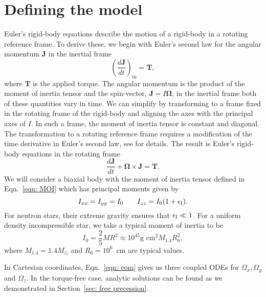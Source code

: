 \documentclass[../full_thesis/full_thesis.tex]{subfiles}
\begin{document}
\section{Defining the model}
\label{sec: defining the model}

Euler's rigid-body equations describe the motion of a rigid-body in a rotating
reference frame. To derive these, we begin with Euler's second law for the
angular momentum $\mathbf{J}$ in the inertial frame
\begin{equation}
    \left(\frac{d\mathbf{J}}{dt}\right)_{\textrm{in}}=\mathbf{T},
\end{equation}
where $\mathbf{T}$ is the applied torque. The angular momentum is the product
of the moment of inertia tensor and the spin-vector, $\mathbf{J}=I \mathbf{\Omega}$; in the inertial
frame both of these quantities vary in time. We can simplify by
transforming to a frame fixed in the rotating frame of the rigid-body and
aligning the axes with the principal axes of $I$. In such a frame, the moment
of inertia tensor is constant and diagonal. The transformation to a rotating reference
frame requires a modification of the time derivative in Euler's second law, see
\citet{Landau1969} for details. The result is Euler's rigid-body equations in
the rotating frame
\begin{equation}
    \frac{d\mathbf{J}}{dt} + \mathbf{\Omega} \times \mathbf{J} = \mathbf{T}.
    \label{eqn: eom}
\end{equation}
We will consider a biaxial body with the moment  of inertia tensor
defined in Eqn.~\eqref{eqn: MOI} which has principal moments given by
\begin{equation}
I_{xx} = I_{yy} = I_{0} \;\;\;\;\;\;\; I_{zz} = I_{0}(1+\epsilon_{\mathrm{I}}).
\end{equation}
For neutron stars, their extreme gravity ensures that $\epsilon_{\mathrm{I}} \ll 1$. For
a uniform density incompressible star, we take a typical moment of inertia to be
\begin{equation}
I_{0} = \frac{2}{5}MR^{2} \approx 10^{45}\textrm{g cm}^{2} M_{1.4}R_6^{2},
\end{equation}
where $M_{1.4} = 1.4 M_{\odot}$ and $R_6=10^{6}$~cm are typical values.

In Cartesian coordinates, Eqn.~\ref{eqn: eom} gives us three coupled ODEs
for $\Omega_{x}, \Omega_{y}$ and $\Omega_{z}$. In the torque-free case, analytic
solutions can be found as we demonstrated in Section~\ref{sec: free precession}.
\end{document}
